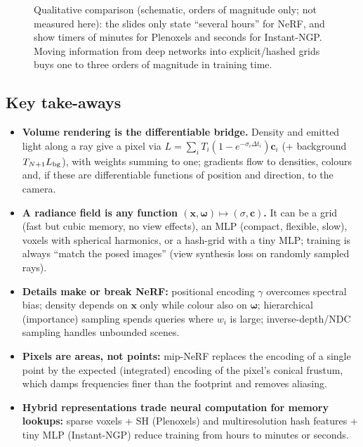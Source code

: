 \documentclass[11pt,a4paper]{article}
\newcommand{\xx}{\boldsymbol{x}}
\newcommand{\om}{\boldsymbol{\omega}}
\newcommand{\cc}{\boldsymbol{c}}
\theoremstyle{definition}
\theoremstyle{plain}
\begin{document}
\begin{figure}[H]
\centering
{}
\caption{Qualitative comparison (schematic, orders of magnitude only; not measured here): the slides only state ``several hours'' for NeRF, and show timers of minutes for Plenoxels and seconds for Instant-NGP. Moving information from deep networks into explicit/hashed grids buys one to three orders of magnitude in training time.}
\end{figure}

\subsection*{Key take-aways}
\begin{itemize}
\item \textbf{Volume rendering is the differentiable bridge.} Density and emitted light along a ray give a pixel via $L=\sum_iT_i(1-e^{-\sigma_i\Delta t_i})\cc_i$ (+ background $T_{N+1}L_{\rm bg}$), with weights summing to one; gradients flow to densities, colours and, if these are differentiable functions of position and direction, to the camera.
\item \textbf{A radiance field is any function $(\xx,\om)\mapsto(\sigma,\cc)$.} It can be a grid (fast but cubic memory, no view effects), an MLP (compact, flexible, slow), voxels with spherical harmonics, or a hash-grid with a tiny MLP; training is always ``match the posed images'' (view synthesis loss on randomly sampled rays).
\item \textbf{Details make or break NeRF:} positional encoding $\gamma$ overcomes spectral bias; density depends on $\xx$ only while colour also on $\om$; hierarchical (importance) sampling spends queries where $w_i$ is large; inverse-depth/NDC sampling handles unbounded scenes.
\item \textbf{Pixels are areas, not points:} mip-NeRF replaces the encoding of a single point by the expected (integrated) encoding of the pixel's conical frustum, which damps frequencies finer than the footprint and removes aliasing.
\item \textbf{Hybrid representations trade neural computation for memory lookups:} sparse voxels + SH (Plenoxels) and multiresolution hash features + tiny MLP (Instant-NGP) reduce training from hours to minutes or seconds.
\end{itemize}
\end{document}

